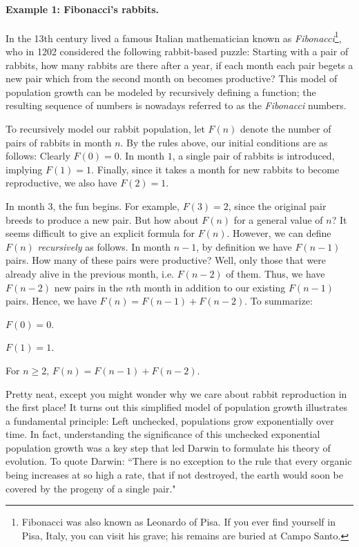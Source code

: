 \documentclass[11pt]{article}
\begin{document}
\paragraph{Example 1: Fibonacci's rabbits.} In the 13th century lived a famous Italian mathematician known as \emph{Fibonacci}\footnote{Fibonacci was also known as Leonardo of Pisa. If you ever find yourself in Pisa, Italy, you can visit his grave; his remains are buried at Campo Santo.}, who in 1202 considered the following rabbit-based puzzle: Starting with a pair of rabbits, how many rabbits are there after a year, if each month each pair begets a new pair which from the second month on becomes productive? This model of population growth can be modeled by recursively defining a function; the resulting sequence of numbers is nowadays referred to as the \emph{Fibonacci} numbers.

To recursively model our rabbit population, let $F(n)$ denote the number of pairs of rabbits in month $n$.  By the rules above, our initial conditions are as follows: Clearly $F(0)=0$. In month $1$, a single pair of rabbits is introduced, implying $F(1) = 1$. Finally, since it takes a month for new rabbits to become reproductive, we also have $F(2) = 1$.

In month $3$, the fun begins. For example, $F(3)=2$, since the original pair breeds to produce a new pair. But how about $F(n)$ for a general value of $n$? It seems difficult to give an explicit formula for $F(n)$. However, we can define $F(n)$ \emph{recursively} as follows. In month $n -1$, by definition we have $F(n-1)$ pairs. How many of these pairs were productive? Well, only those that were already alive in the previous month, i.e. $F(n-2)$ of them. Thus, we have $F(n-2)$ new pairs in the $n$th month in addition to our existing $F(n-1)$ pairs. Hence, we have $F(n) = F(n-1) + F(n-2)$. To summarize:
\begin{compactitem}
	\item $F(0) = 0$.
    \item $F(1) = 1$.
	\item For $n \geq 2$, $F(n) = F(n-1) + F(n-2)$.
\end{compactitem}
Pretty neat, except you might wonder why we care about rabbit reproduction in the first place! It turns out this simplified model of population growth illustrates a fundamental principle: Left unchecked, populations grow exponentially over time. 
In fact, understanding the significance of this unchecked exponential population growth
was a key step that led Darwin to formulate his theory of evolution.
To quote Darwin: ``There is no exception to the rule that every organic being
increases at so high a rate, that if not destroyed, the earth would soon be
covered by the progeny of a single pair."
\end{document}
